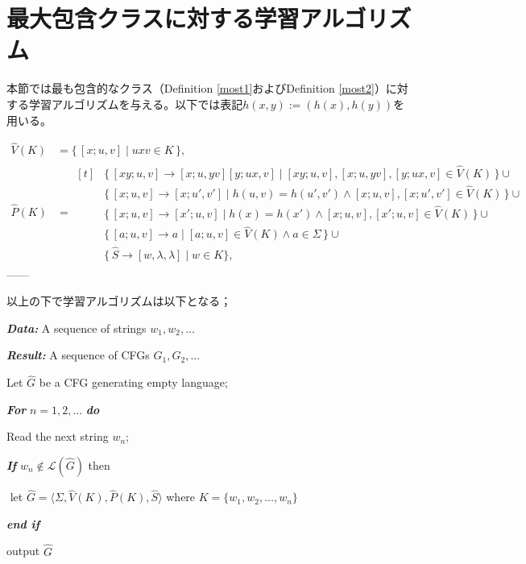 \documentclass{jsbook}
\newlength{\zw}
\begin{document}
\chapter{最大包含クラスに対する学習アルゴリズム}

本節では最も包含的なクラス（Definition \ref{most1}およびDefinition \ref{most2}）に対する学習アルゴリズムを与える。以下では表記$h(x,y):=(h(x),h(y))$を用いる。

\begin{align*}
\hat{V}(K) & = \{\, [x; u,v] \mid uxv \in K \,\},\\
\hat{P}(K) & =
\begin{aligned}[t]
& \{\, [xy; u,v] \to [x; u,yv][y; ux,v] \mid [xy; u,v], [x; u,yv], [y; ux,v] \in \hat{V}(K) \,\}  \cup {}\\
& \{\, [x; u,v] \to [x; u',v'] \mid h(u,v)=h(u',v') \land [x; u,v], [x; u',v'] \in \hat{V}(K) \,\} \cup {}\\
& \{\, [x; u,v] \to [x'; u,v] \mid h(x)=h(x') \land [x; u,v], [x'; u,v] \in \hat{V}(K) \,\} \cup {}\\
& \{\, [a; u,v] \to a \mid [a; u,v] \in \hat{V}(K)\land a\in\Sigma \,\} \cup {}\\
& \{\, \hat{S} \to [w,\lambda,\lambda]  \mid w\in K\},
\end{aligned}
\end{align*}
------

以上の下で学習アルゴリズムは以下となる；

\emph{\bf{Data:}} A sequence of strings $w_1,w_2,...$

\emph{\bf{Result:}} A sequence of CFGs $G_1,G_2,...$

\hspace{1\zw}Let $\hat{G}$ be a CFG generating empty language;

\hspace{1\zw}\emph{\bf{For}} $n=1,2,...$ \emph{\bf{do}}

\hspace{2\zw}Read the next string $w_n$;

\hspace{2\zw}\emph{\bf{If}} $w_n\notin\mathcal{L}(\hat{G})$ then

\,\,\hspace{3\zw}let $\hat{G}=\langle\Sigma,\hat{V}(K),\hat{P}(K),\hat{S}\rangle$ where $K=\{w_1,w_2,...,w_n\}$

\hspace{2\zw}\emph{\bf{end if}}

\hspace{1\zw}output $\hat{G}$
\end{document}
